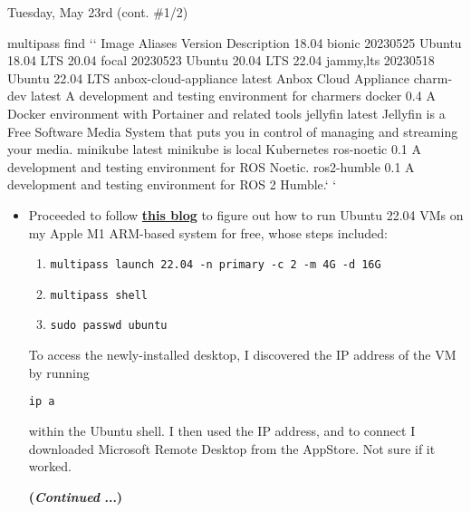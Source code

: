 \documentclass[11pt]{article}
\makeatletter
\newcommand\codebox[1]{
    \noindent\hspace{-0.25em}\begin{tcolorbox}[on line, hbox, colback = codeblack, colframe = codeborder, coltext = white, boxrule = 1.5pt, left = 2pt, right = 2pt, top = 0.5pt, bottom = 0.5pt]
    \small\texttt{#1}\normalsize
    \end{tcolorbox}
}
\newcommand{\SU}[1]{\pgfkeys{/ubuntu/.cd,#1}
    \gdef\MyUbuntuPrompt{\textcolor{\MyUbuntuColor}{\small\ttfamily\bfseries \MyUbuntuUser@\MyUbuntuHost{}\hspace{0.2cm}\textcolor{white}{\url{~}}\hspace{0.2cm}{\textcolor{white}\MyUbuntuPromptChar}}}}
\newcommand{\StartConsole}{\gdef\MyUbuntuPrompt{}}
\makeatother
\begin{document}
\begin{redbox}{Tuesday, May 23rd (cont. \#1/2)}
\begin{ubuntu}
 multipass find `\StartConsole` 
Image                   Aliases      Version     Description
18.04                   bionic       20230525    Ubuntu 18.04 LTS
20.04                   focal        20230523    Ubuntu 20.04 LTS
22.04                   jammy,lts    20230518    Ubuntu 22.04 LTS
anbox-cloud-appliance                latest      Anbox Cloud Appliance
charm-dev                            latest      A development and 
                                                 testing environment 
                                                 for charmers
docker                               0.4         A Docker environment 
                                                 with Portainer and 
                                                 related tools
jellyfin                             latest      Jellyfin is a Free 
                                                 Software Media System 
                                                 that puts you in 
                                                 control of managing 
                                                 and streaming your 
                                                 media.
minikube                             latest      minikube is local 
                                                 Kubernetes
ros-noetic                           0.1         A development and 
                                                 testing environment 
                                                 for ROS Noetic.
ros2-humble                          0.1         A development and 
                                                 testing environment 
                                                 for ROS 2 Humble.`\SU{root}`
    
    \end{ubuntu}
\begin{itemize}
    \item Proceeded to follow \href{https://medium.com/@paulrobu/how-to-run-ubuntu-22-04-vms-on-apple-m1-arm-based-systems-for-free-c8283fb38309}{\textbf{this blog}} to figure out how to run Ubuntu 22.04 VMs on my Apple M1 ARM-based system for free, whose steps included:
    \begin{enumerate}
        \item\codebox{multipass launch 22.04 -n primary -c 2 -m 4G -d 16G}
        \item\codebox{multipass shell}
        \item\codebox{sudo passwd ubuntu}
    \end{enumerate}
    To access the newly-installed desktop, I discovered the IP address of the VM by running \codebox{ip a}within the Ubuntu shell. I then used the IP address, and to connect I downloaded Microsoft Remote Desktop from the AppStore. Not sure if it worked.
    \begin{center}
        \large\textbf{(\textit{Continued} ...)}
    \end{center}
\end{itemize}
\end{redbox}
\end{document}

